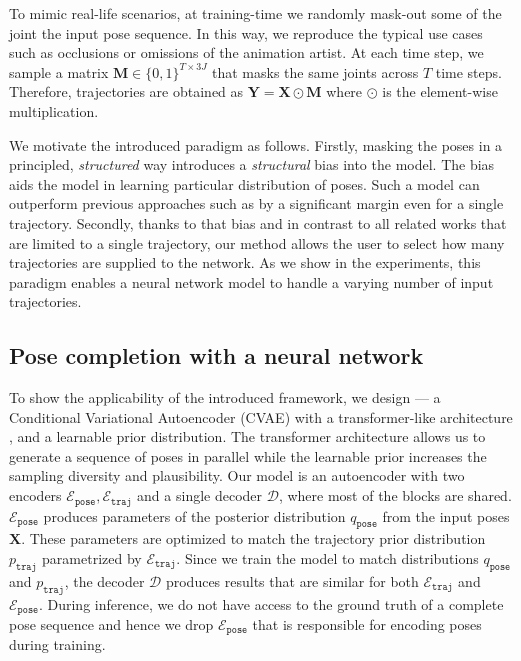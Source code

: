 \documentclass[10pt,twocolumn,letterpaper]{article}
\newcommand{\code}[1]{\texttt{#1}}
\begin{document}
To mimic real-life scenarios, at training-time we randomly mask-out some of the joint the input pose sequence.
In this way, we reproduce the typical use cases such as occlusions or omissions of the animation artist. At each time step, we sample a matrix $\mathbf{M} \in \{0,1\}^{T\times 3J}$ that masks the same joints across $T$ time steps. Therefore, trajectories are obtained as $\mathbf{Y} = \mathbf{X} \odot \mathbf{M}$ where $\odot$ is the element-wise multiplication. 

We motivate the introduced paradigm as follows. Firstly, masking the poses in a principled, \textit{structured} way introduces a \textit{structural} bias into the model. The bias aids the model in learning particular distribution of poses. Such a model can outperform previous approaches such as \cite{kaufmann2020convolutional} by a significant margin even for a single trajectory. 
Secondly, thanks to that bias and in contrast to all related works that are limited to a single trajectory, our method allows the user to select how many trajectories are supplied to the network. 
As we show in the experiments, this paradigm enables a neural network model to handle a varying number of input trajectories. 

\subsection{Pose completion with a neural network}
To show the applicability of the introduced framework, we design \trajevae{} --- a Conditional Variational Autoencoder (CVAE) \cite{kingma2013auto} with a transformer-like architecture \cite{vaswani2017attention,wang2019t}, and a learnable prior distribution. %
The transformer architecture allows us to generate a sequence of poses in  parallel while the learnable prior increases the sampling diversity and plausibility.
Our model is an autoencoder with two encoders $\mathcal{E}_\code{pose}, \mathcal{E}_\code{traj}$ and a single decoder $\mathcal{D}$, where most of the blocks are shared. 
$\mathcal{E}_\code{pose}$ produces parameters of the posterior distribution $q_\code{pose}$ from the input poses $\mathbf{X}$. These parameters are optimized to match the trajectory prior distribution $p_\code{traj}$ parametrized by $\mathcal{E}_\code{traj}$.  Since we train the model to match distributions $q_\code{pose}$ and $p_\code{traj}$, the decoder $\mathcal{D}$ produces results that are similar for both $\mathcal{E}_\code{traj}$ and $\mathcal{E}_\code{pose}$.
During inference, we do not have access to the ground truth of a complete pose sequence and hence we drop $\mathcal{E}_\code{pose}$ that is responsible for encoding poses during training. 
\end{document}
